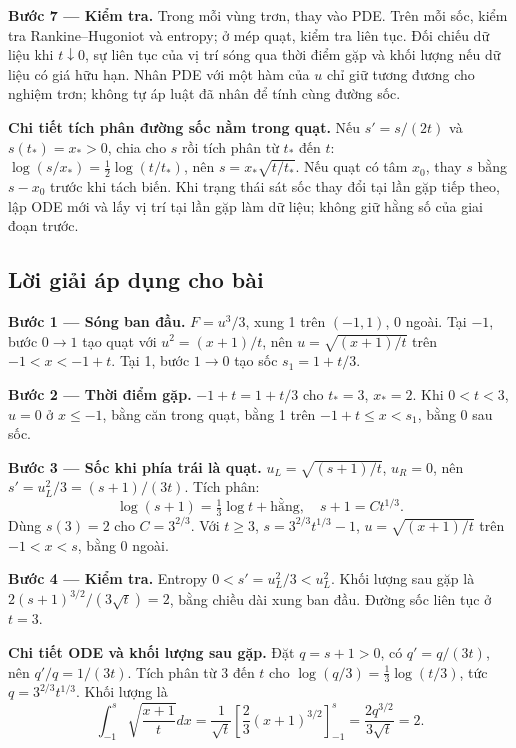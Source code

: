 \documentclass[10pt,a4paper]{article}
\begin{document}
\textbf{Bước 7 — Kiểm tra.} Trong mỗi vùng trơn, thay vào PDE. Trên mỗi sốc, kiểm tra Rankine–Hugoniot và entropy; ở mép quạt, kiểm tra liên tục. Đối chiếu dữ liệu khi $t\downarrow0$, sự liên tục của vị trí sóng qua thời điểm gặp và khối lượng nếu dữ liệu có giá hữu hạn. Nhân PDE với một hàm của $u$ chỉ giữ tương đương cho nghiệm trơn; không tự áp luật đã nhân để tính cùng đường sốc.

\textbf{Chi tiết tích phân đường sốc nằm trong quạt.} Nếu $s'=s/(2t)$ và $s(t_*)=x_*>0$, chia cho $s$ rồi tích phân từ $t_*$ đến $t$: $\log(s/x_*)=\frac12\log(t/t_*)$, nên $s=x_*\sqrt{t/t_*}$. Nếu quạt có tâm $x_0$, thay $s$ bằng $s-x_0$ trước khi tách biến. Khi trạng thái sát sốc thay đổi tại lần gặp tiếp theo, lập ODE mới và lấy vị trí tại lần gặp làm dữ liệu; không giữ hằng số của giai đoạn trước.
\subsection*{Lời giải áp dụng cho bài}
\textbf{Bước 1 — Sóng ban đầu.} $F=u^3/3$, xung 1 trên $(-1,1)$, 0 ngoài. Tại $-1$, bước $0\to1$ tạo quạt với $u^2=(x+1)/t$, nên $u=\sqrt{(x+1)/t}$ trên $-1<x<-1+t$. Tại 1, bước $1\to0$ tạo sốc $s_1=1+t/3$.

\textbf{Bước 2 — Thời điểm gặp.} $-1+t=1+t/3$ cho $t_*=3$, $x_*=2$. Khi $0<t<3$, $u=0$ ở $x\le-1$, bằng căn trong quạt, bằng 1 trên $-1+t\le x<s_1$, bằng 0 sau sốc.

\textbf{Bước 3 — Sốc khi phía trái là quạt.} $u_L=\sqrt{(s+1)/t}$, $u_R=0$, nên $s'=u_L^2/3=(s+1)/(3t)$. Tích phân:
\[\log(s+1)=\tfrac13\log t+\text{hằng},\quad s+1=Ct^{1/3}.\]
Dùng $s(3)=2$ cho $C=3^{2/3}$. Với $t\ge3$, $s=3^{2/3}t^{1/3}-1$, $u=\sqrt{(x+1)/t}$ trên $-1<x<s$, bằng 0 ngoài.

\textbf{Bước 4 — Kiểm tra.} Entropy $0<s'=u_L^2/3<u_L^2$. Khối lượng sau gặp là $2(s+1)^{3/2}/(3\sqrt t)=2$, bằng chiều dài xung ban đầu. Đường sốc liên tục ở $t=3$.

\textbf{Chi tiết ODE và khối lượng sau gặp.} Đặt $q=s+1>0$, có $q'=q/(3t)$, nên $q'/q=1/(3t)$. Tích phân từ $3$ đến $t$ cho $\log(q/3)=\frac13\log(t/3)$, tức $q=3^{2/3}t^{1/3}$. Khối lượng là
\[\int_{-1}^{s}\sqrt{\frac{x+1}{t}}dx
=\frac1{\sqrt t}\left[\frac23(x+1)^{3/2}\right]_{-1}^{s}
=\frac{2q^{3/2}}{3\sqrt t}=2.\]
\end{document}
